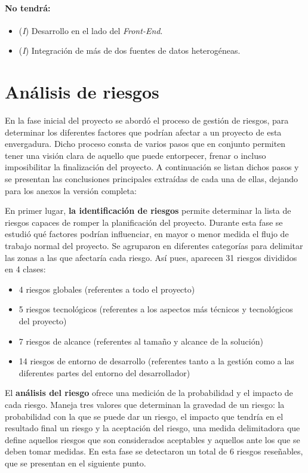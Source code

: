 \paragraph*{No tendrá:} 
\begin{itemize}
\item (\textit{I}) Desarrollo en el lado del \textit{Front-End}.
\item (\textit{I}) Integración de más de dos fuentes de datos heterogéneas. 
\end{itemize}




\section{Análisis de riesgos}  \label{analisis.riesgos}
En la fase inicial del proyecto se abordó el proceso de gestión de riesgos, para determinar los diferentes factores que podrían afectar a un proyecto de esta envergadura. Dicho proceso consta de varios pasos que en conjunto permiten tener una visión clara de aquello que puede entorpecer, frenar o incluso imposibilitar la finalización del proyecto. A continuación se listan dichos pasos y se presentan las conclusiones principales extraídas de cada una de ellas, dejando para los anexos la versión completa: 
\par En primer lugar, \textbf{la identificación de riesgos} permite determinar la lista de riesgos capaces de romper la planificación del proyecto. Durante esta fase se estudió qué factores podrían influenciar, en mayor o menor medida el flujo de trabajo normal del proyecto. Se agruparon en diferentes categorías para delimitar las zonas a las que afectaría cada riesgo. Así pues, aparecen 31 riesgos divididos en 4 clases:
\begin{itemize}
\item 4 riesgos globales (referentes a todo el proyecto)
\item 5 riesgos tecnológicos (referentes a los aspectos más técnicos y tecnológicos del proyecto)
\item 7 riesgos de alcance (referentes al tamaño y alcance de la solución)
\item 14 riesgos de entorno de desarrollo (referentes tanto a la gestión como a las diferentes partes del entorno del desarrollador)
\end{itemize}
\par El \textbf{análisis del riesgo} ofrece una medición de la probabilidad y el impacto de cada riesgo. Maneja tres valores que determinan la gravedad de un riesgo: la probabilidad con la que se puede dar un riesgo, el impacto que tendría en el resultado final un riesgo y la aceptación del riesgo, una medida delimitadora que define aquellos riesgos que son considerados aceptables y aquellos ante los que se deben tomar medidas. En esta fase se detectaron un total de 6 riesgos reseñables, que se presentan en el siguiente punto.

